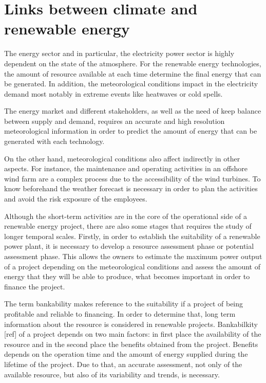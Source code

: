 

\section{Links between climate and renewable energy}

The energy sector and in particular, the electricity power sector is highly dependent on the state of the atmosphere. For the renewable energy technologies, the amount of resource available at each time determine the final energy that can be generated. In addition, the meteorological conditions impact in the electricity demand most notably in extreme events like heatwaves or cold spells.

The energy market and different stakeholders, as well as the need of keep balance between supply and demand, requires an accurate and high resolution meteorological information in order to predict the amount of energy that can be generated with each technology. 

On the other hand, meteorological conditions also affect indirectly in other aspects. For instance, the maintenance and operating activities in an offshore wind farm are a complex process due to the accessibility of the wind turbines. To know beforehand the weather forecast is necessary in order to plan the activities and avoid the risk exposure of the employees.

Although the short-term activities are in the core of the operational side of a renewable energy project, there are also some stages that requires the study of longer temporal scales. Firstly, in order to establish the suitability of a renewable power plant, it is necessary to develop a resource assessment phase or potential assessment phase. This allows the owners to estimate the maximum power output of a project depending on the meteorological conditions and assess the amount of energy that they will be able to produce, what becomes important in order to finance the project.  

The term bankability makes reference to the suitability if a project of being profitable and reliable to financing. In order to determine that, long term information about the resource is considered in renewable projects. Bankabilkity [ref] of a project depends on two main factors: in first place the availability of the resource and in the second place the benefits obtained from the project. Benefits depends on the operation time and the amount of energy supplied during the lifetime of the project. Due to that, an accurate assessment, not only of the available resource, but also of its variability and trends, is necessary. 


